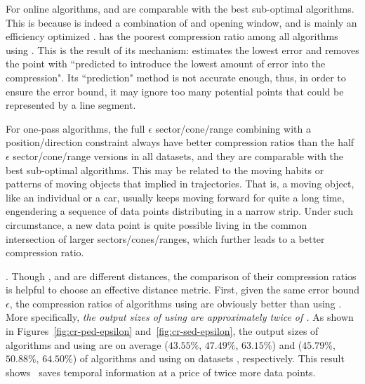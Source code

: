 For online algorithms, \bqsa and \opwa are comparable with the best sub-optimal algorithms. This is because \opwa is indeed a combination of \dpa and opening window, and \bqsa is mainly an efficiency optimized \opwa.
\squishe has the poorest compression ratio among all algorithms using \sed. This is the result of its mechanism: \squishe estimates the lowest \sed error and removes the point with ``predicted to introduce the lowest amount of error into the compression"\cite{Muckell:SQUISH}. Its ``prediction" method is not accurate enough, thus, in order to ensure the error bound, it may ignore too many potential points that could be represented by a line segment.

For one-pass algorithms, the full $\epsilon$ sector/cone/range combining with a position/direction constraint always have better compression ratios than the half $\epsilon$ sector/cone/range versions in all datasets, and they are comparable with the best sub-optimal algorithms.
This may be related to the moving habits or patterns of moving objects that implied in trajectories.
That is, a moving object, like an individual or a car, usually keeps moving forward for quite a long time, engendering a sequence of data points distributing in a narrow strip. Under such circumstance, a new data point is quite possible living in the common intersection of larger sectors/cones/ranges, which further leads to a better compression ratio.



.
Though \ped, \sed and \dad are different distances, the comparison of their compression ratios is helpful to choose an effective distance metric.
%
First, given the same error bound $\epsilon$, the compression ratios of algorithms using \ped are obviously better
than using \sed. More specifically, \emph{the output sizes of using \sed are approximately twice of \ped.}
%
As shown in Figures~\ref{fig:cr-ped-epsilon} and~\ref{fig:cr-sed-epsilon}, the output sizes of algorithms \tpa and \dpa
using \ped are on average ($43.55\%$, $47.49\%$, $63.15\%$) and ($45.79\%$,
$50.88\%$, $64.50\%$) of algorithms \tpa and \dpa using \sed on datasets \dSets, respectively.
%
%
This result shows ~\sed saves temporal information at a price of twice more data points.


